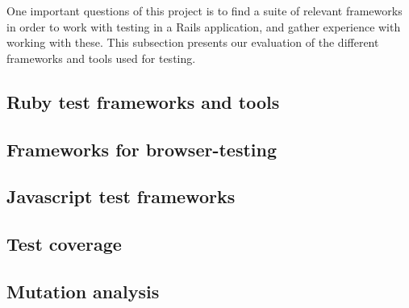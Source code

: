 \MakeShortVerb{\|}
\label{sec:choices}

One important questions of this project is to find a suite of relevant
frameworks in order to work with testing in a Rails application, and
gather experience with working with these. This subsection presents our
evaluation of the different frameworks and tools used for testing.\\

\subsection{Ruby test frameworks and tools}


\subsection{Frameworks for browser-testing}


\subsection{Javascript test frameworks}


\subsection{Test coverage}


\subsection{Mutation analysis}

